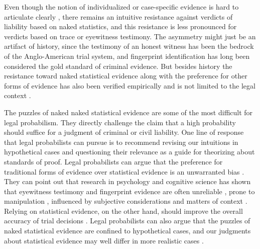 \documentclass{article}
\begin{document}
Even though the notion of individualized or case-specific evidence is hard to articulate clearly \citep{schoeman87, tillers2005if}, there remains an intuitive resistance against verdicts of liability based on naked statistics, and this resistance is less pronounced for verdicts based on trace or eyewitness testimony. %
The asymmetry might just be an artifact of history, since the testimony of an honest witness has been the bedrock of the Anglo-American trial system, and fingerprint identification has long been considered the gold standard of criminal evidence. 
But besides history the resistance toward naked statistical evidence along with the preference for other forms of evidence has also been verified empirically  \citep{wells1992naked, niedermeierEtAl1999, arkesEtAl2012} and is not limited to the legal context \citep{sykes1999, friedman2015, ebert2018}. 




The puzzles of naked naked statistical  evidence are some of the most difficult for legal probabilism. They directly challenge the claim that a high probability should suffice for a judgment  of criminal or civil liability.  
One line of  response  that legal probabilists can pursue is to recommend revising our intuitions in hypothetical cases and questioning their relevance as a guide for theorizing about  standards of proof.
Legal probabilists can argue that the preference for traditional forms of evidence over statistical evidence is an unwarranted bias \citep{
laudan2006truth, papineau2019}.
They can point out that research in psychology and cognitive science has shown that eyewitness testimony and fingerprint evidence are often unreliable \citep{Simons1999Gorillas},  prone to manipulation \citep{Loftus1996}, influenced  by subjective considerations and matters of context \citep{Dror2006, Zabell2005Fingerprint-Evi}. 
Relying on statistical  evidence, on the other hand, should improve the overall accuracy of trial decisions \citep{Koehler1990Veridical-Verdi}. 
Legal probabilists can also argue that the puzzles of naked statistical evidence are confined to hypothetical cases, and our judgments about statistical evidence  may well differ in more realistic cases \citep{hedden2019, ross2020}.
\end{document}
